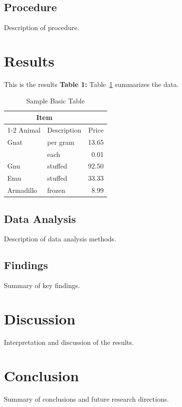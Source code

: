 \documentclass[a4paper,draftfirst,jou,12pt]{apa7}
\begin{document}
\subsection{Procedure}
\lipsum[5]
Description of procedure.

\section{Results}
This is the results
\textbf{Table 1:} Table~\ref{tab:BasicTable} summarizes the data.
\begin{table}
  \caption{Sample Basic Table}
  \label{tab:BasicTable}
  \begin{tabular}{@{}llr@{}}         \toprule
  \multicolumn{2}{c}{Item}        \\ \cmidrule(r){1-2}
  Animal    & Description & Price \\ \midrule
  Gnat      & per gram    & 13.65 \\
            & each        &  0.01 \\
  Gnu       & stuffed     & 92.50 \\
  Emu       & stuffed     & 33.33 \\
  Armadillo & frozen      &  8.99 \\ \bottomrule
  \end{tabular}
\end{table}

\subsection{Data Analysis}
\lipsum[7]
Description of data analysis methods.
\subsection{Findings}
\lipsum[8]
Summary of key findings.

\section{Discussion}
Interpretation and discussion of the results.
\lipsum[9-11]

\section{Conclusion}
Summary of conclusions and future research directions.
\lipsum[12]

\nocite{*}
\printbibliography

\end{document}
